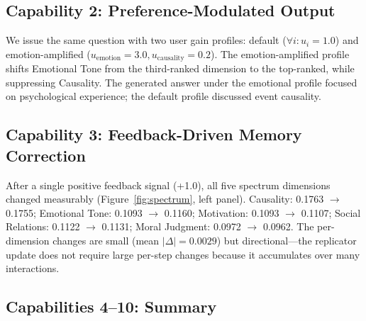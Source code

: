 \documentclass[review]{elsarticle}
\begin{document}
\subsection{Capability 2: Preference-Modulated Output}

We issue the same question with two user gain profiles: default ($\forall i:
u_i = 1.0$) and emotion-amplified ($u_{\text{emotion}} = 3.0,
u_{\text{causality}} = 0.2$). The emotion-amplified profile shifts Emotional
Tone from the third-ranked dimension to the top-ranked, while suppressing
Causality. The generated answer under the emotional profile focused on
psychological experience; the default profile discussed event causality.

\subsection{Capability 3: Feedback-Driven Memory Correction}

After a single positive feedback signal (+1.0), all five spectrum dimensions
changed measurably (Figure~\ref{fig:spectrum}, left panel). Causality: 0.1763
$\to$ 0.1755; Emotional Tone: 0.1093 $\to$ 0.1160; Motivation: 0.1093 $\to$
0.1107; Social Relations: 0.1122 $\to$ 0.1131; Moral Judgment: 0.0972 $\to$
0.0962. The per-dimension changes are small (mean $|\Delta| = 0.0029$) but
directional---the replicator update does not require large per-step changes
because it accumulates over many interactions.

\subsection{Capabilities 4--10: Summary}
\end{document}
